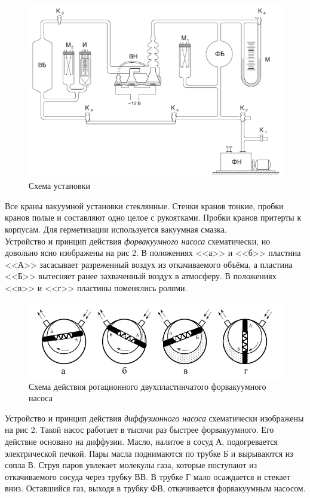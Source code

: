 \documentclass[a4paper, 12pt]{article}
\begin{document}
  \begin{figure}[!h]
 	\centering
 	\includegraphics[width=0.5\linewidth]{3.png}
 	\caption[]{Схема установки}
 	\label{fig:Схема установки}
 \end{figure}
 
 Все краны вакуумной установки стеклянные. Стенки кранов тонкие, пробки кранов полые и составляют одно целое с рукоятками. Пробки кранов притерты к корпусам. Для герметизации используется вакуумная смазка. \\
 
 Устройство и принцип действия \textit{форвакуумного насоса} схематически, но довольно ясно изображены на рис 2. В положениях <<а>> и <<б>> пластина <<А>> засасывает разреженный воздух из откачиваемого объёма, а пластина <<Б>> вытесняет ранее захваченный воздух в атмосферу. В положениях <<в>> и <<г>> пластины поменялись ролями.
 
\begin{figure}[!h]
	\centering
	\includegraphics[width=0.9\linewidth]{4.png}
	\caption[]{Схема действия ротационного двухпластинчатого форвакуумного насоса}
	\label{fig:Схема ФВ насоса}
\end{figure}

Устройство и принцип действия \textit{диффузионного насоса} схематически изображены на рис 2. Такой насос работает в тысячи раз быстрее форвакуумного. Его действие основано на диффузии. Масло, налитое в сосуд А, подогревается электрической печкой. Пары масла поднимаются по трубке Б и вырываются из сопла В. Струя паров увлекает молекулы газа, которые поступают из откачиваемого сосуда через трубку ВВ. В трубке Г мало осаждается и стекает вниз. Оставшийся газ, выходя в трубку ФВ, откачивается форвакуумным насосом. \\
\end{document}
